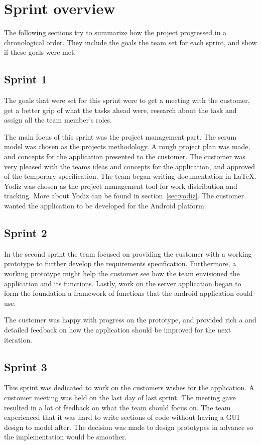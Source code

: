 \section{Sprint overview}
The following sections try to summarize how the project progressed in a chronological order. They include the goals the team set for each sprint, and show if these goals were met.

\subsection{Sprint 1}
The goals that were set for this sprint were to get a meeting with the customer, get a better grip of what the tasks ahead were, research about the task and assign all the team member's roles.

The main focus of this sprint was the project management part. The scrum model was chosen as the projects methodology. A rough project plan was made, and concepts for the application presented to the customer. The customer was very pleased with the teams ideas and concepts for the application, and approved of the temporary specification. The team began writing documentation in \LaTeX. Yodiz was chosen as the project management tool for work distribution and tracking. More about Yodiz can be found in section~\ref{sec:yodiz}. The customer wanted the application to be developed for the Android platform.

\subsection{Sprint 2}
In the second sprint the team focused on providing the customer with a working
prototype to further develop the requirements specification. Furthermore, a
working prototype might help the customer see how the team envisioned the application
and its functions. Lastly, work on the server application began to form the
foundation a framework of functions that the android application could use.

The customer was happy with progress on the prototype, and provided rich a and detailed feedback on how the application should be improved for the next iteration.

\subsection{Sprint 3}
This sprint was dedicated to work on the customers wishes for the application. A customer meeting was held on the last day of last sprint. The meeting gave resulted in a lot of feedback on what the team should focus on. The team experienced that it was hard to write sections of code without having a GUI design to model after. The decision was made to design prototypes in advance so the implementation would be smoother.


